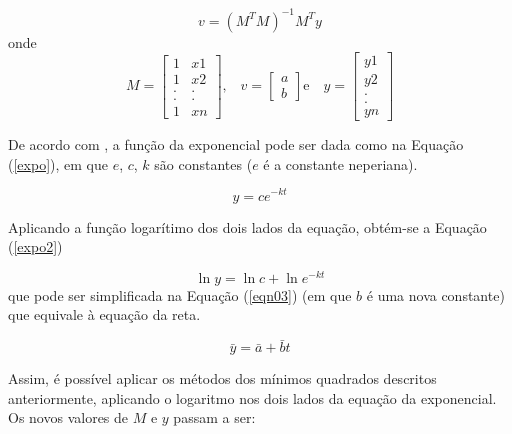 {	\begin{equation}
		v =( M^{T}M)^{-1}M^{T}y
	\label{minquad}
	\end{equation}
	onde
	\begin{equation}
	M = \left[\begin{array}{cc}
               	1 & x1 \\
               	1 & x2  \\
		. & .  \\
               	. & .  \\
		1 & xn
          	         \end{array}\right] \mbox{,} \quad
	v = \left[\begin{array}{c}
               	a \\
               	b  
          	         \end{array}\right] \mbox{e} \quad
	y = \left[\begin{array}{c}
               	y1 \\
               	y2  \\
		.   \\
               	.   \\
		yn
          	         \end{array}\right] 	
	\label{variaveis}
	\end{equation}

	De acordo com \cite{calculo}, a função da exponencial pode ser dada como na Equação (\ref{expo}), em que $e$, $c$, $k$ são constantes ($e$ é a constante neperiana).  

	\begin{equation}
	\label{expo}
		y = ce^{-kt}
	\end{equation}

	Aplicando a função logarítimo dos dois lados da equação, obtém-se a  Equação (\ref{expo2})

	\begin{equation}
	\label{expo2}
		\ln{y} = \ln{c}  + \ln{e^{-kt}}
	\end{equation}
 	que pode ser simplificada na  Equação (\ref{eqn03}) (em que $b$ é uma nova constante) que equivale à equação da reta. 

	\begin{equation}
	\label{eqn03}
		\bar{y} = \bar{a} + \bar{b}t
	\end{equation}	

	Assim, é possível aplicar os métodos dos mínimos quadrados descritos anteriormente, aplicando o logaritmo nos dois lados da equação da exponencial. Os novos valores de $M$ e $y$ passam a ser: 

}
